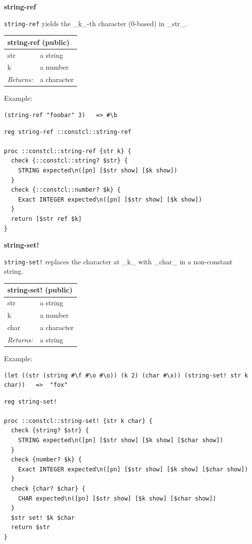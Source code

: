 \documentclass[twoside,9pt]{report}
\begin{document}
\textbf{string-ref}


\texttt{string-ref} yields the \_k\_-th character (0-based) in \_str\_.

\begin{tabular}{ |l l| }
\hline
\multicolumn{2}{|l|}{string-ref (public)} \\
\hline
str & a string \\
k & a number \\
\textit{Returns:} & a character \\
\hline
\end{tabular}


Example:

\noindent\makebox[\linewidth]{\rule{\linewidth}{0.4pt}}
\begin{lstlisting}
(string-ref "foobar" 3)   => #\b
\end{lstlisting}
\noindent\makebox[\linewidth]{\rule{\linewidth}{0.4pt}}
\noindent\makebox[\linewidth]{\rule{\linewidth}{0.4pt}}
\begin{lstlisting}
reg string-ref ::constcl::string-ref
 
proc ::constcl::string-ref {str k} {
  check {::constcl::string? $str} {
    STRING expected\n([pn] [$str show] [$k show])
  }
  check {::constcl::number? $k} {
    Exact INTEGER expected\n([pn] [$str show] [$k show])
  }
  return [$str ref $k]
}
\end{lstlisting}
\noindent\makebox[\linewidth]{\rule{\linewidth}{0.4pt}}

\textbf{string-set!}


\texttt{string-set!} replaces the character at \_k\_ with \_char\_ in a non-constant string.

\begin{tabular}{ |l l| }
\hline
\multicolumn{2}{|l|}{string-set! (public)} \\
\hline
str & a string \\
k & a number \\
char & a character \\
\textit{Returns:} & a string \\
\hline
\end{tabular}


Example:

\noindent\makebox[\linewidth]{\rule{\linewidth}{0.4pt}}
\begin{lstlisting}
(let ((str (string #\f #\o #\o)) (k 2) (char #\x)) (string-set! str k char))   =>  "fox"
\end{lstlisting}
\noindent\makebox[\linewidth]{\rule{\linewidth}{0.4pt}}
\noindent\makebox[\linewidth]{\rule{\linewidth}{0.4pt}}
\begin{lstlisting}
reg string-set!
 
proc ::constcl::string-set! {str k char} {
  check {string? $str} {
    STRING expected\n([pn] [$str show] [$k show] [$char show])
  }
  check {number? $k} {
    Exact INTEGER expected\n([pn] [$str show] [$k show] [$char show])
  }
  check {char? $char} {
    CHAR expected\n([pn] [$str show] [$k show] [$char show])
  }
  $str set! $k $char
  return $str
}
\end{lstlisting}
\noindent\makebox[\linewidth]{\rule{\linewidth}{0.4pt}}
\end{document}

